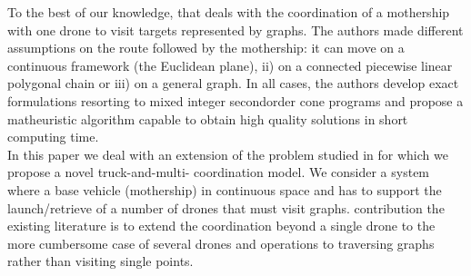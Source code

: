 To the best of our knowledge,  that deals with the coordination of a mothership with one drone to visit targets represented by graphs. The authors made different assumptions on the route followed by the mothership: it can move on a continuous framework (the Euclidean plane), ii) on a connected piecewise linear polygonal chain\RE{,} or iii) on a general graph. In all cases, the authors develop exact formulations resorting to mixed integer second\RE{-}order cone programs and propose a matheuristic algorithm capable to obtain high quality solutions in short computing time.
\\
In this paper we deal with an extension of the problem studied in \cite{art:Amorosi2021} for which we propose a novel truck-and-multi- coordination model. We consider a system where a base vehicle (mothership)  in  continuous space and has to support the launch/retrieve of a number of drones that must visit graphs.  contribution  the existing literature is to extend the coordination beyond a single drone to the more cumbersome case of several drones and operations to traversing graphs rather than visiting single points. 

\noindent



